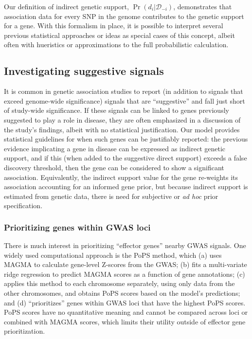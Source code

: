 \documentclass[11pt]{article}
\begin{document}
Our definition of indirect genetic support,
$\Pr\left(d_i|\mathcal{D}_{-i}\right)$, demonstrates that association
data for every SNP in the genome contributes to the genetic support
for a gene. With this formalism in place, it is possible to interpret
several previous statistical approaches or ideas as special cases of
this concept, albeit often with hueristics or approximations to the
full probabilistic calculation.

\subsection{Investigating suggestive signals}
It is common in genetic association studies to report (in addition to
signals that exceed genome-wide significance) signals that are
``suggestive'' and fall just short of study-wide significance. If
these signals can be linked to genes previously suggested to play a
role in disease, they are often emphasized in a discussion of the
study's findings, albeit with no statistical justification. Our model
provides statistical guidelines for when such genes can be justifiably
reported: the previous evidence implicating a gene in disease can be
expressed as indirect genetic support, and if this (when added to the
suggestive direct support) exceeds a false discovery threshold, then
the gene can be considered to show a significant
association. Equivalently, the indirect support value for the gene re-weights its
association accounting for an informed gene prior, but because
indirect support is estimated from genetic data, there is need for
subjective or \textit{ad hoc} prior specification.

\subsubsection{Prioritizing genes within GWAS loci}
There is much interest in prioritizing ``effector genes'' nearby GWAS
signals\cite{costanzo}. One widely used computational approach is the
PoPS method\cite{}, which (a) uses MAGMA\cite{} to calculate
gene-level Z-scores from the GWAS; (b) fits a multi-variate ridge
regression to predict MAGMA scores as a function of gene annotations;
(c) applies this method to each chromosome separately, using only data
from the other chromosomes, and obtains PoPS scores based on the
model's predictions; and (d) ``prioritizes'' genes
within GWAS loci that have the highest PoPS scores. PoPS scores have
no quantitative meaning and cannot be compared across loci or combined
with MAGMA scores, which limits their utility outside of effector gene
prioritization.
\end{document}
